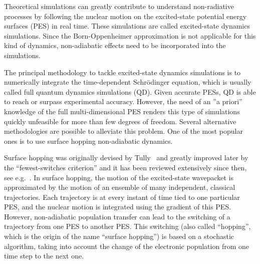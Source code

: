 \documentclass[a4paper,11pt,DIV=15,openany,twoside=false]{scrbook}
\begin{document}
Theoretical simulations can greatly contribute to understand non-radiative processes by following the nuclear motion on the excited-state potential energy surfaces (PES) in real time. These simulations are called excited-state dynamics simulations. 
Since the Born-Oppenheimer approximation is not applicable for this kind of dynamics, non-adiabatic effects need to be incorporated into the simulations.

The principal methodology to tackle excited-state dynamics simulations is to numerically integrate the time-dependent Schr\"odinger equation, which is usually called full quantum dynamics simulations (QD). Given accurate PESs, QD is able to reach or surpass experimental accuracy. However, the need of an ''a priori'' knowledge of the full multi-dimensional PES renders this type of simulations quickly unfeasible for more than few degrees of freedom. Several alternative methodologies are possible to alleviate this problem. One of the most popular ones is to use surface hopping non-adiabatic dynamics.

Surface hopping was originally devised by Tully~\cite{Tully1971JCP} and greatly improved later by the ``fewest-switches criterion''\cite{Tully1990JCP} and it has been reviewed extensively since then, see e.g.~\cite{Barbatti2011WCMS,Doltsinis2006,Doltsinis2002JTCC}.
In surface hopping, the motion of the excited-state wavepacket is approximated by the motion of an ensemble of many independent, classical trajectories. Each trajectory is at every instant of time tied to one particular PES, and the nuclear motion is integrated using the gradient of this PES. However, non-adiabatic population transfer can lead to the switching of a trajectory from one PES to another PES. This switching (also called ``hopping'', which is the origin of the name ``surface hopping'') is based on a stochastic algorithm, taking into account the change of the electronic population from one time step to the next one.
\end{document}

